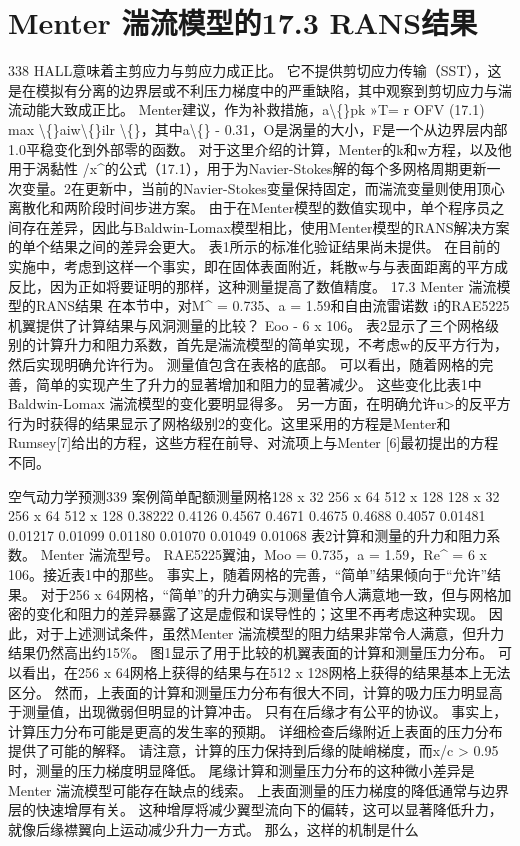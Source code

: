 \documentclass[UTF8,11pt,a4paper,openany,fontset=fandol]{ctexbook}
\begin{document}
\section{Menter 湍流模型的17.3 RANS结果}
338 HALL意味着主剪应力与剪应力成正比。 它不提供剪切应力传输（SST），这是在模拟有分离的边界层或不利压力梯度中的严重缺陷，其中观察到剪切应力与湍流动能大致成正比。 Menter建议，作为补救措施，a\textbackslash\{\}pk »T= r OFV (17.1) max \textbackslash\{\}aiw\textbackslash\{\}ilr \textbackslash\{\}，其中a\textbackslash\{\} - 0.31，O是涡量的大小，F是一个从边界层内部1.0平稳变化到外部零的函数。 对于这里介绍的计算，Menter的k和w方程，以及他用于涡黏性 /x\textasciicircum{}的公式（17.1），用于为Navier-Stokes解的每个多网格周期更新一次变量。2在更新中，当前的Navier-Stokes变量保持固定，而湍流变量则使用顶心离散化和两阶段时间步进方案。 由于在Menter模型的数值实现中，单个程序员之间存在差异，因此与Baldwin-Lomax模型相比，使用Menter模型的RANS解决方案的单个结果之间的差异会更大。 表1所示的标准化验证结果尚未提供。 在目前的实施中，考虑到这样一个事实，即在固体表面附近，耗散w与与表面距离的平方成反比，因为正如将要证明的那样，这种测量提高了数值精度。 17.3 Menter 湍流模型的RANS结果 在本节中，对M\textasciicircum{} = 0.735、a = 1.59和自由流雷诺数 i的RAE5225机翼提供了计算结果与风洞测量的比较？ Eoo - 6 x 106。 表2显示了三个网格级别的计算升力和阻力系数，首先是湍流模型的简单实现，不考虑w的反平方行为，然后实现明确允许行为。 测量值包含在表格的底部。 可以看出，随着网格的完善，简单的实现产生了升力的显著增加和阻力的显著减少。 这些变化比表1中Baldwin-Lomax 湍流模型的变化要明显得多。 另一方面，在明确允许u>的反平方行为时获得的结果显示了网格级别2的变化。这里采用的方程是Menter和Rumsey[7]给出的方程，这些方程在前导、对流项上与Menter [6]最初提出的方程不同。

空气动力学预测339 案例简单配额测量网格128 x 32 256 x 64 512 x 128 128 x 32 256 x 64 512 x 128 0.38222 0.4126 0.4567 0.4671 0.4675 0.4688 0.4057 0.01481 0.01217 0.01099 0.01180 0.01070 0.01049 0.01068 表2计算和测量的升力和阻力系数。 Menter 湍流型号。 RAE5225翼油，Moo = 0.735，a = 1.59，Re\textasciicircum{} = 6 x 106。接近表1中的那些。 事实上，随着网格的完善，“简单”结果倾向于“允许”结果。 对于256 x 64网格，“简单”的升力确实与测量值令人满意地一致，但与网格加密的变化和阻力的差异暴露了这是虚假和误导性的；这里不再考虑这种实现。 因此，对于上述测试条件，虽然Menter 湍流模型的阻力结果非常令人满意，但升力结果仍然高出约15\%。 图1显示了用于比较的机翼表面的计算和测量压力分布。 可以看出，在256 x 64网格上获得的结果与在512 x 128网格上获得的结果基本上无法区分。 然而，上表面的计算和测量压力分布有很大不同，计算的吸力压力明显高于测量值，出现微弱但明显的计算冲击。 只有在后缘才有公平的协议。 事实上，计算压力分布可能是更高的发生率的预期。 详细检查后缘附近上表面的压力分布提供了可能的解释。 请注意，计算的压力保持到后缘的陡峭梯度，而x/c > 0.95时，测量的压力梯度明显降低。 尾缘计算和测量压力分布的这种微小差异是Menter 湍流模型可能存在缺点的线索。 上表面测量的压力梯度的降低通常与边界层的快速增厚有关。 这种增厚将减少翼型流向下的偏转，这可以显著降低升力，就像后缘襟翼向上运动减少升力一方式。 那么，这样的机制是什么
\end{document}
